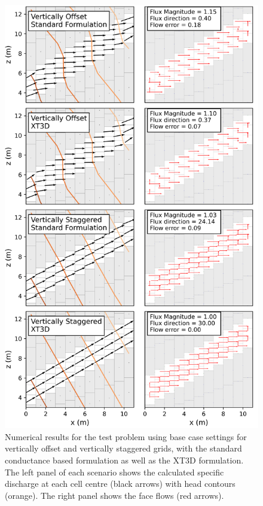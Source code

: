 \documentclass{article}
\begin{document}
\begin{figure}[p!]
	\begin{center}
	\includegraphics[scale=0.8]{../figures/fig2_paper.png}
	\caption{Numerical results for the test problem using base case settings for vertically offset and vertically staggered grids, with the standard conductance based formulation as well as the XT3D formulation. The left panel of each scenario shows the calculated specific discharge at each cell centre (black arrows) with head contours (orange). The right panel shows the face flows (red arrows).}
	\label{fig:fig2}
	\end{center}
\end{figure}
\end{document}

